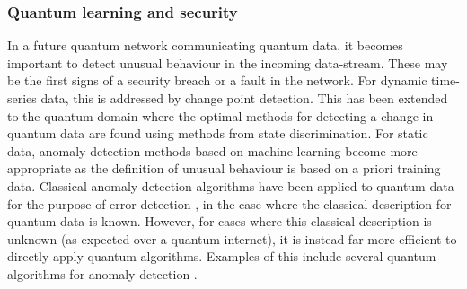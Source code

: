 \documentclass[twocolumn, aps, rmp, amsmath, amssymb, nofootinbib, superscriptaddress, longbibliography, floatfix, table-of-contents, eqsecnum]{revtex4}
\begin{document}
\subsubsection{Quantum learning and security}

In a future quantum network communicating quantum data, it becomes important to detect unusual behaviour in the incoming data-stream. These may be the first signs of a security breach or a fault in the network. For dynamic time-series data, this is addressed by change point detection. This has been extended to the quantum domain \cite{bib:gael1, bib:gael2} where the optimal methods for detecting a change in quantum data are found using methods from state discrimination. For static data, anomaly detection methods based on machine learning become more appropriate as the definition of unusual behaviour is based on a priori training data. Classical anomaly detection algorithms have been applied to quantum data for the purpose of error detection \cite{bib:sara}, in the case where the classical description for quantum data is known. However, for cases where this classical description is unknown (as expected over a quantum internet), it is instead far more efficient to directly apply quantum algorithms. Examples of this include several quantum algorithms for anomaly detection \cite{bib:liu2018quantum}.


\end{document}
